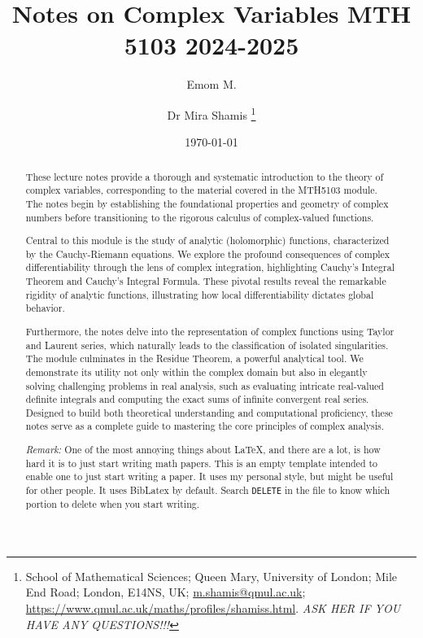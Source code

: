 \documentclass[12pt]{article}
\makeatletter
\newcommand{\week}[1]{\section*{Week #1}}
\newcommand{\lecture}[2]{\subsection*{Lecture #1: #2}}
\newcommand{\MiraThanks}[1]{%
\thanks{%
      School of Mathematical Sciences; %
      Queen Mary, University of London; %
      Mile End Road; %
      London, E14NS, UK; %
      \href{m.shamis@qmul.ac.uk}{m.shamis@qmul.ac.uk}; %
      \url{https://www.qmul.ac.uk/maths/profiles/shamiss.html}. %
   #1%
   }%
}
\makeatother
\begin{document}
\title{Notes on Complex Variables MTH 5103 2024-2025}

\author{%
   Emom M.%
   \and%
   Dr Mira Shamis%
   \MiraThanks{\emph{ASK HER IF YOU HAVE ANY QUESTIONS!!!}}
}

\date{\today}

\maketitle

\begin{abstract}
    These lecture notes provide a thorough and systematic introduction to the theory of complex variables, corresponding to the material covered in the MTH5103 module. The notes begin by establishing the foundational properties and geometry of complex numbers before transitioning to the rigorous calculus of complex-valued functions.

    Central to this module is the study of analytic (holomorphic) functions, characterized by the Cauchy-Riemann equations. We explore the profound consequences of complex differentiability through the lens of complex integration, highlighting Cauchy's Integral Theorem and Cauchy's Integral Formula. These pivotal results reveal the remarkable rigidity of analytic functions, illustrating how local differentiability dictates global behavior.

    Furthermore, the notes delve into the representation of complex functions using Taylor and Laurent series, which naturally leads to the classification of isolated singularities. The module culminates in the Residue Theorem, a powerful analytical tool. We demonstrate its utility not only within the complex domain but also in elegantly solving challenging problems in real analysis, such as evaluating intricate real-valued definite integrals and computing the exact sums of infinite convergent real series. Designed to build both theoretical understanding and computational proficiency, these notes serve as a complete guide to mastering the core principles of complex analysis.

   \emph{Remark:}
   One of the most annoying things about \LaTeX, and there are a lot,
   is how hard it is to just start writing math papers. This is an
   empty template intended to enable one to just start writing a
   paper. It uses my personal style, but might be useful for other people. It uses BibLatex by default. Search \texttt{DELETE} in the file to know which portion to delete when you start writing.
   \end{abstract}
\newpage
\tableofcontents
\end{document}
